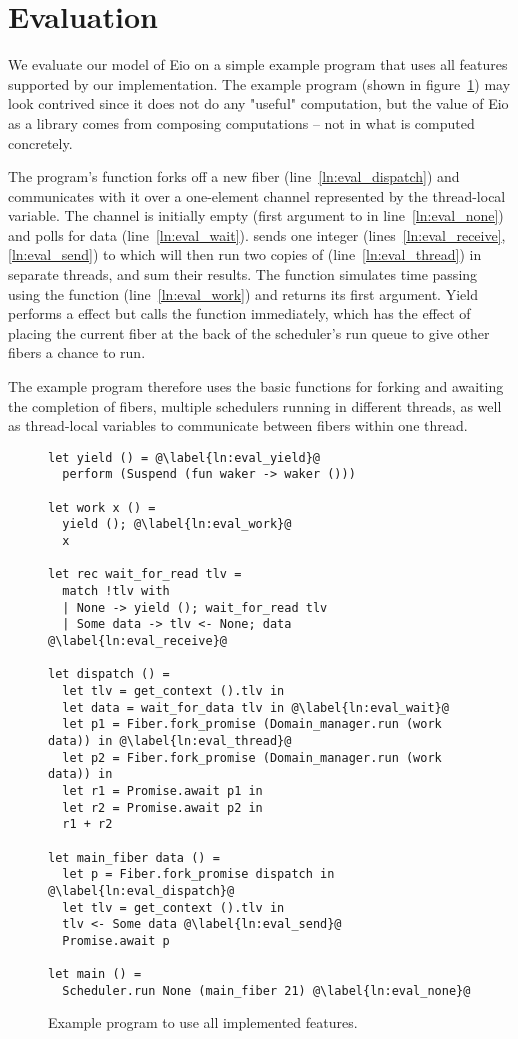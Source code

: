 \section{Evaluation}
\label{sec:evaluation}
We evaluate our model of Eio on a simple example program that uses all features supported by our implementation.
The example program (shown in figure~\ref{fig:eval_code}) may look contrived since it does not do any "useful" computation, but the value of Eio as a library comes from composing computations -- not in what is computed concretely.

The program's  function forks off a new fiber  (line~\ref{ln:eval_dispatch}) and communicates with it over a one-element channel represented by the thread-local variable.
The channel is initially empty (first argument to  in line~\ref{ln:eval_none}) and  polls for data (line~\ref{ln:eval_wait}).
 sends one integer  (lines~\ref{ln:eval_receive},\ref{ln:eval_send}) to  which will then run two copies of  (line~\ref{ln:eval_thread}) in separate threads, and sum their results.
The  function simulates time passing using the  function (line~\ref{ln:eval_work}) and returns its first argument.
Yield performs a \esuspend{} effect but calls the  function immediately, which has the effect of placing the current fiber at the back of the scheduler's run queue to give other fibers a chance to run.

The example program therefore uses the basic functions for forking and awaiting the completion of fibers, multiple schedulers running in different threads, as well as thread-local variables to communicate between fibers within one thread.

\begin{figure}[ht]
    \begin{verbatim}
let yield () = @\label{ln:eval_yield}@
  perform (Suspend (fun waker -> waker ()))

let work x () = 
  yield (); @\label{ln:eval_work}@
  x

let rec wait_for_read tlv =
  match !tlv with
  | None -> yield (); wait_for_read tlv
  | Some data -> tlv <- None; data @\label{ln:eval_receive}@

let dispatch () =
  let tlv = get_context ().tlv in
  let data = wait_for_data tlv in @\label{ln:eval_wait}@
  let p1 = Fiber.fork_promise (Domain_manager.run (work data)) in @\label{ln:eval_thread}@
  let p2 = Fiber.fork_promise (Domain_manager.run (work data)) in
  let r1 = Promise.await p1 in
  let r2 = Promise.await p2 in
  r1 + r2

let main_fiber data () =
  let p = Fiber.fork_promise dispatch in @\label{ln:eval_dispatch}@
  let tlv = get_context ().tlv in
  tlv <- Some data @\label{ln:eval_send}@
  Promise.await p

let main () = 
  Scheduler.run None (main_fiber 21) @\label{ln:eval_none}@
\end{verbatim}
    \caption{Example program to use all implemented features.}
    \label{fig:eval_code}
\end{figure}

